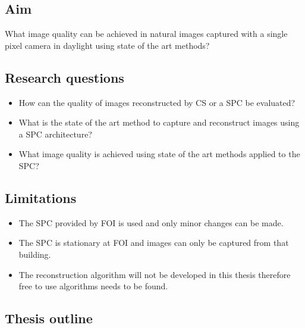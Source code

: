 \subsection{Aim} 
What image quality can be achieved in natural images captured with a single pixel camera in daylight using state of the art methods?  


\subsection{Research questions} 
\label{sec:RQ}
\begin{itemize}
    \item How can the quality of images reconstructed by CS or a SPC be evaluated?
    \item What is the state of the art method to capture and reconstruct images using a SPC architecture?
    \item What image quality is achieved using state of the art methods applied to the SPC?
\end{itemize}

\subsection{Limitations}
\begin{itemize}
    \item The SPC provided by FOI is used and only minor changes can be made.
    \item The SPC is stationary at FOI and images can only be captured from that building.
    \item The reconstruction algorithm will not be developed in this thesis therefore free to use algorithms needs to be found.
\end{itemize}



\subsection{Thesis outline}
